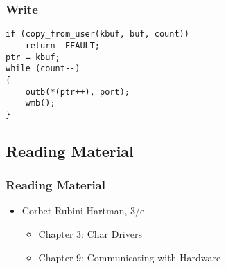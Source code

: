 \documentclass[dvipsnames]{beamer}
\begin{document}
\begin{frame}[fragile]
  \frametitle{Write}

  \begin{exampleblock}{}
    \begin{lstlisting}
if (copy_from_user(kbuf, buf, count))
    return -EFAULT;
ptr = kbuf;
while (count--)
{
    outb(*(ptr++), port);
    wmb();
}
    \end{lstlisting}
  \end{exampleblock}
\end{frame}

\subsection*{Reading Material}

\begin{frame}
  \frametitle{Reading Material}

  \begin{itemize}
    \item Corbet-Rubini-Hartman, 3/e
    \begin{itemize}
      \item Chapter 3: \alert{Char Drivers}
      \item Chapter 9: \alert{Communicating with Hardware}
    \end{itemize}
  \end{itemize}
\end{frame}
\end{document}
